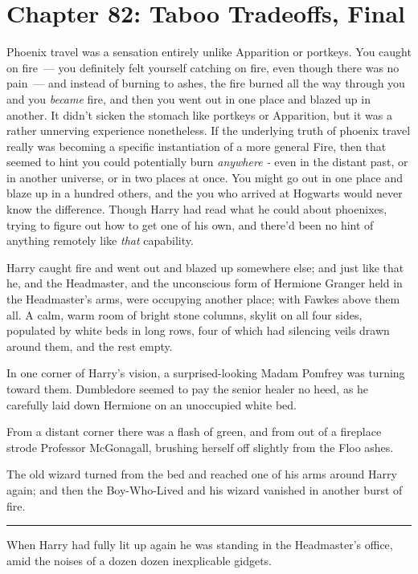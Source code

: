\chapter{Chapter 82: Taboo Tradeoffs, Final}
Phoenix travel was a sensation entirely unlike Apparition or portkeys. You caught on fire~--- you definitely felt yourself catching on fire, even though there was no pain~--- and instead of burning to ashes, the fire burned all the way through you and you \emph{became} fire, and then you went out in one place and blazed up in another. It didn't sicken the stomach like portkeys or Apparition, but it was a rather unnerving experience nonetheless. If the underlying truth of phoenix travel really was becoming a specific instantiation of a more general Fire, then that seemed to hint you could potentially burn \emph{anywhere -} even in the distant past, or in another universe, or in two places at once. You might go out in one place and blaze up in a hundred others, and the you who arrived at Hogwarts would never know the difference. Though Harry had read what he could about phoenixes, trying to figure out how to get one of his own, and there'd been no hint of anything remotely like \emph{that} capability.

Harry caught fire and went out and blazed up somewhere else; and just like that he, and the Headmaster, and the unconscious form of Hermione Granger held in the Headmaster's arms, were occupying another place; with Fawkes above them all. A calm, warm room of bright stone columns, skylit on all four sides, populated by white beds in long rows, four of which had silencing veils drawn around them, and the rest empty.

In one corner of Harry's vision, a surprised-looking Madam Pomfrey was turning toward them. Dumbledore seemed to pay the senior healer no heed, as he carefully laid down Hermione on an unoccupied white bed.

From a distant corner there was a flash of green, and from out of a fireplace strode Professor McGonagall, brushing herself off slightly from the Floo ashes.

The old wizard turned from the bed and reached one of his arms around Harry again; and then the Boy-Who-Lived and his wizard vanished in another burst of fire.

\begin{center}\rule{3in}{0.4pt}\end{center}

When Harry had fully lit up again he was standing in the Headmaster's office, amid the noises of a dozen dozen inexplicable gidgets.

